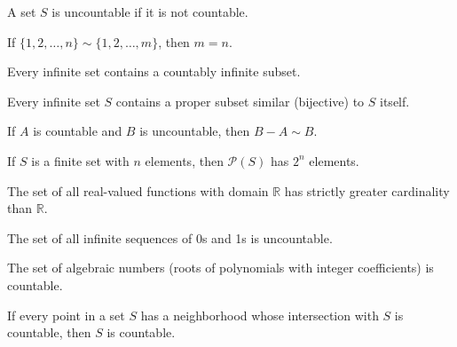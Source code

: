 \begin{definition}
A set $S$ is uncountable if it is not countable.
\end{definition}

\begin{theorem}
If $\{1, 2, \ldots, n\} \sim \{1, 2, \ldots, m\}$, then $m = n$.
\end{theorem}

\begin{theorem}
Every infinite set contains a countably infinite subset.
\end{theorem}

\begin{theorem}
Every infinite set $S$ contains a proper subset similar (bijective) to $S$ itself.
\end{theorem}

\begin{theorem}
If $A$ is countable and $B$ is uncountable, then $B - A \sim B$.
\end{theorem}

\begin{theorem}
If $S$ is a finite set with $n$ elements, then $\mathcal{P}(S)$ has $2^n$ elements.
\end{theorem}

\begin{theorem}
The set of all real-valued functions with domain $\mathbb{R}$ has strictly greater cardinality than $\mathbb{R}$.
\end{theorem}

\begin{theorem}
The set of all infinite sequences of 0s and 1s is uncountable.
\end{theorem}

\begin{theorem}
The set of algebraic numbers (roots of polynomials with integer coefficients) is countable.
\end{theorem}

\begin{theorem}
If every point in a set $S$ has a neighborhood whose intersection with $S$ is countable, then $S$ is countable.
\end{theorem}

